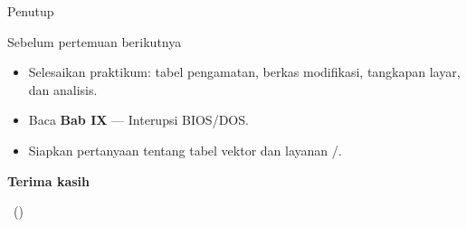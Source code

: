\documentclass[aspectratio=169,11pt]{beamer}
\begin{document}
\begin{frame}{Penutup}
\begin{block}{Sebelum pertemuan berikutnya}
\small
\begin{itemize}
    \item Selesaikan praktikum: tabel pengamatan, berkas
           modifikasi, tangkapan layar, dan analisis.
    \item Baca \textbf{Bab IX} — Interupsi BIOS/DOS.
    \item Siapkan pertanyaan tentang tabel vektor dan layanan
          /.
\end{itemize}
\end{block}

\vspace{0.4em}
\begin{center}
{\color{obeBlue}\sffamily\large\bfseries Terima kasih\par}
\vspace{0.15em}
{\color{obeGray}\sffamily\small \NamaMK\ (\KodeMK)
\textbullet\ \SemesterTeks\par}
\end{center}
\end{frame}
\end{document}

